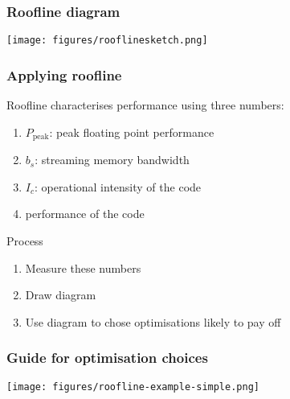 \documentclass[dvipsnames,presentation,aspectratio=169,14pt]{beamer}
\begin{document}
\begin{frame}
  \frametitle{Roofline diagram}
  \begin{center}
    \texttt{[image: figures/rooflinesketch.png]}
  \end{center}
\end{frame}

\begin{frame}
  \frametitle{Applying roofline}
  Roofline characterises performance using three numbers:
  \vskip 6pt
  \begin{enumerate}[itemsep=6pt,leftmargin=60pt]
  \item[\structure{HW1.}] $P_\text{peak}$: peak floating point performance
  \item[\structure{HW2.}] $b_s$: streaming memory bandwidth
  \item[\structure{SW1.}] $I_c$: operational intensity of the code
  \item[\structure{SW2.}] performance of the code
  \end{enumerate}

  \vskip 5pt

  \begin{answer}{Process}
    \begin{enumerate}[wide=0pt]
    \item Measure these numbers
    \item Draw diagram
    \item Use diagram to chose optimisations likely to pay off
    \end{enumerate}
  \end{answer}
\end{frame}

\begin{frame}
  \frametitle{Guide for optimisation choices}
  \vskip -4pt
  \begin{center}
    \texttt{[image: figures/roofline-example-simple.png]}
  \end{center}
\end{frame}
\end{document}
